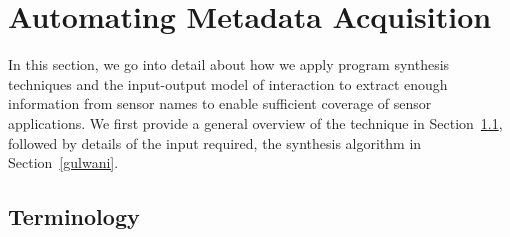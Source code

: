 \section{Automating Metadata Acquisition}
%
%

In this section, we go into detail about how we apply program synthesis techniques and the input-output model of interaction to extract enough information from sensor names to enable sufficient coverage of sensor applications. We first provide a  general overview of the technique in Section~\ref{}, followed by details of the input required, the synthesis algorithm in Section~\ref{gulwani}. 

%

\subsection{Terminology}

